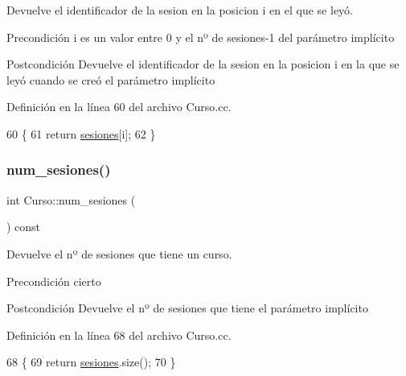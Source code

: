 Devuelve el identificador de la sesion en la posicion i en el que se leyó. 

\begin{DoxyPrecond}{Precondición}
i es un valor entre 0 y el nº de sesiones-\/1 del parámetro implícito 
\end{DoxyPrecond}
\begin{DoxyPostcond}{Postcondición}
Devuelve el identificador de la sesion en la posicion i en la que se leyó cuando se creó el parámetro implícito 
\end{DoxyPostcond}


Definición en la línea 60 del archivo Curso.\+cc.


\begin{DoxyCode}
60                                          \{
61         \textcolor{keywordflow}{return} \mbox{\hyperlink{class_curso_acd47bc8fe2f8121284246241d1e1dab5}{sesiones}}[i];
62       \}
\end{DoxyCode}
\mbox{\label{class_curso_a1cf7c335137c295ea160a9682c10c07a}} 
\subsubsection{\texorpdfstring{num\+\_\+sesiones()}{num\_sesiones()}}
{\footnotesize\ttfamily int Curso\+::num\+\_\+sesiones (\begin{DoxyParamCaption}{ }\end{DoxyParamCaption}) const}



Devuelve el nº de sesiones que tiene un curso. 

\begin{DoxyPrecond}{Precondición}
cierto 
\end{DoxyPrecond}
\begin{DoxyPostcond}{Postcondición}
Devuelve el nº de sesiones que tiene el parámetro implícito 
\end{DoxyPostcond}


Definición en la línea 68 del archivo Curso.\+cc.


\begin{DoxyCode}
68                                     \{
69         \textcolor{keywordflow}{return} \mbox{\hyperlink{class_curso_acd47bc8fe2f8121284246241d1e1dab5}{sesiones}}.size();
70       \}
\end{DoxyCode}
\mbox{\label{class_curso_a8141469f11a8e4431540314577d4bee2}} 
